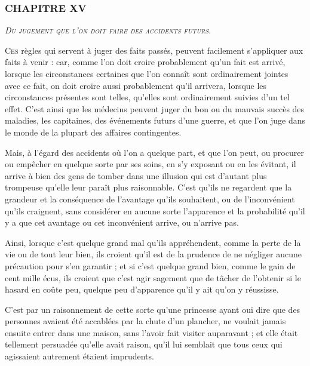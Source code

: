 \subsubsection{\centering \Large CHAPITRE XV}
\begin{center}\emph{\large\scshape Du jugement que l'on doit faire des accidents futurs.}\end{center}

	\lettrine{C}{es} règles qui servent à juger des faits passés, peuvent facilement s'appliquer aux faits à venir : car, comme l'on doit croire probablement qu'un fait est arrivé, lorsque les circonstances certaines que l'on connaît sont ordinairement jointes avec ce fait, on doit croire aussi probablement qu'il arrivera, lorsque les circonstances présentes sont telles, qu'elles sont ordinairement suivies d'un tel effet. C'est ainsi que les médecins peuvent juger du bon ou du mauvais succès des maladies, les capitaines, des événements futurs d'une guerre, et que l'on juge dans le monde de la plupart des affaires contingentes.

Mais, à l'égard des accidents où l'on a quelque part, et que l'on peut, ou procurer ou empêcher en quelque sorte par ses soins, en s'y exposant ou en les évitant, il arrive à bien des gens de tomber dans une illusion qui est d'autant plus trompeuse qu'elle leur paraît plus raisonnable. C'est qu'ils ne regardent que la grandeur et la conséquence de l'avantage qu'ils souhaitent, ou de l'inconvénient qu'ils craignent, sans considérer en aucune sorte l'apparence et la probabilité qu'il y a que cet avantage ou cet inconvénient arrive, ou n'arrive pas.

Ainsi, lorsque c'est quelque grand mal qu'ils appréhendent, comme la perte de la vie ou de tout leur bien, ils croient qu'il est de la prudence de ne négliger aucune précaution pour s'en garantir ; et si c'est quelque grand bien, comme le gain de cent mille écus, ils croient que c'est agir sagement que de tâcher de l'obtenir si le hasard en coûte peu, quelque peu d'apparence qu'il y ait qu'on y réussisse.

C'est par un raisonnement de cette sorte qu'une princesse ayant ouï dire que des personnes avaient été accablées par la chute d'un plancher, ne voulait jamais ensuite entrer dans une maison, sans l'avoir fait visiter auparavant ; et elle était tellement persuadée qu'elle avait raison, qu'il lui semblait que tous ceux qui agissaient autrement étaient imprudents.

